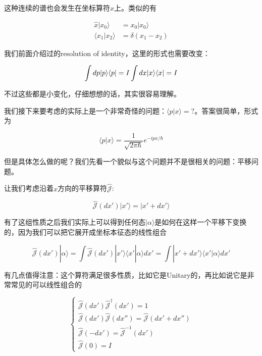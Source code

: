 这种连续的谱也会发生在坐标算符$\hat x$上。类似的有

\begin{align}
\hat x|x_0\rangle &= x_0 |x_0\rangle\\
\langle x_1|x_2\rangle &= \delta(x_1-x_2)
\end{align}

我们前面介绍过的resolution of identity，这里的形式也需要改变：

\begin{equation}
\int dp|p\rangle\langle p| = I\\
\int dx|x\rangle\langle x| = I
\end{equation}

不过这些都是小变化，仔细想想的话，其实很容易理解。

我们接下来要考虑的实际上是一个非常奇怪的问题：$\langle p|x\rangle = ?$。答案很简单，形式为

\begin{equation}
\langle p|x\rangle = \frac{1}{\sqrt{2\pi \hbar}}e^{-ipx/\hbar}
\end{equation}

但是具体怎么做的呢？我们先看一个貌似与这个问题并不是很相关的问题：平移问题。

让我们考虑沿着$x$方向的平移算符$\hat{\mathcal J}$: 

\begin{equation}
\hat{\mathcal{J}}(dx')|x'\rangle = |x'+dx'\rangle
\end{equation}

有了这组性质之后我们实际上可以得到任何态$|\alpha\rangle$是如何在这样一个平移下变换的，因为我们可以把它展开成坐标本征态的线性组合

\begin{equation}
\hat{\mathcal{J}}(dx')|\alpha\rangle = \int\hat{\mathcal{J}}(dx')|x'\rangle\langle x'|\alpha\rangle dx' = \int|x'+dx'\rangle\langle x'|\alpha\rangle dx'
\end{equation}

有几点值得注意：这个算符满足很多性质，比如它是Unitary的，再比如说它是非常常见的可以线性组合的

\begin{equation}
\begin{cases}
\hat{\mathcal{J}}(dx')\hat{\mathcal{J}}^{\dagger}(dx') = 1\\
\hat{\mathcal{J}}(dx')\hat{\mathcal{J}}(dx'') = \hat{\mathcal{J}}(dx' + dx'')\\
\hat{\mathcal{J}}(-dx') = \hat{\mathcal{J}}^{-1}(dx')\\
\hat{\mathcal{J}}(0) = I
\end{cases}
\end{equation}

